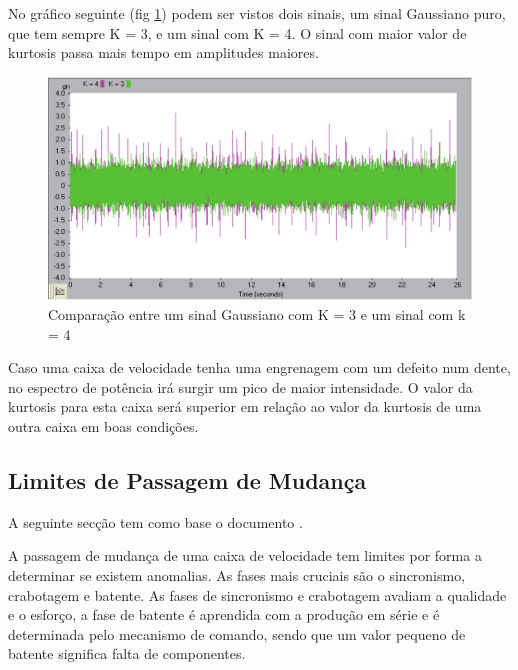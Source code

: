 No gráfico seguinte (fig \ref{kurtosis1}) podem ser vistos dois sinais, um sinal Gaussiano puro, que tem sempre K = 3, e um sinal com K = 4. O sinal com maior valor de kurtosis passa mais tempo em amplitudes maiores.


\begin{figure}[H]
\centering
\includegraphics[scale=0.3]{figs/Kurtosis1}
\caption{Comparação entre um sinal Gaussiano com K = 3 e um sinal com k = 4 }\label{kurtosis1}
\end{figure}

Caso uma caixa de velocidade tenha uma engrenagem com um defeito num dente, no espectro de potência irá surgir um pico de maior intensidade. O valor da kurtosis para esta caixa será superior em relação ao valor da kurtosis de uma outra caixa em boas condições.




\subsection{Limites de Passagem de Mudança}
A seguinte secção tem como base o documento \cite{passagemMud} . 

A passagem de mudança de uma caixa de velocidade tem limites por forma a determinar se existem anomalias. As fases mais cruciais são o sincronismo, crabotagem e batente. As fases de sincronismo e crabotagem avaliam a qualidade e o esforço, a fase de batente é aprendida com a produção em série e é determinada pelo mecanismo de comando, sendo que um valor pequeno de batente significa falta de componentes.


